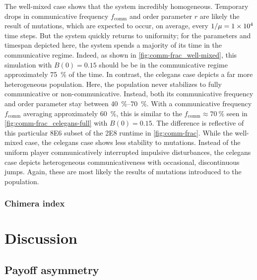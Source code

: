 \documentclass[pdflatex,lineno,referee,sn-mathphys-ay]{sn-jnl}
\begin{document}
The  well-mixed case
shows that the system incredibly homogeneous.
Temporary drops in communicative frequency $f_{\text{comm}}$
and order parameter $r$ are likely the result of mutations,
which are expected to occur, on average, every $1/\mu = \num{1E4}$ time steps.
But the system quickly returns to uniformity;
for the parameters and timespan depicted here,
the system spends a majority of its time in the communicative regime.
Indeed, as shown in \cref{fig:comm-frac_well-mixed},
this simulation with $B(0) = 0.15$ should be be in the communicative regime
approximately \SI{75}{\percent} of the time.
In contrast, the  \gls{celegans} case
depicts a far more heterogeneous population.
Here, the population never stabilizes to fully communicative or non-communicative.
Instead, both its communicative frequency and order parameter
stay between \SIrange{40}{70}{\percent}.
With a communicative frequency $f_{\text{comm}}$ averaging approximately \SI{60}{\percent},
this is similar to the $f_{\text{comm}} \approx \SI{70}{\percent}$ seen
in \cref{fig:comm-frac_celegans-full} with $B(0) = 0.15$.
The difference is reflective of this particular \num{8E6} subset
of the \num{2E8} runtime in \cref{fig:comm-frac}.
While the  well-mixed case,
the \gls{celegans} case shows less stability to mutations.
Instead of the uniform player communicatively interrupted
impulsive disturbances,
the \gls{celegans} case depicts heterogeneous communicativeness
with occasional, discontinuous jumps.
Again, these are most likely the results of mutations introduced
to the population.

\subsubsection{Chimera index}
\begin{figure}
\end{figure}

\begin{figure}
\end{figure}

\section{Discussion}
\label{sec:discussion}

\subsection{Payoff asymmetry}
\end{document}
